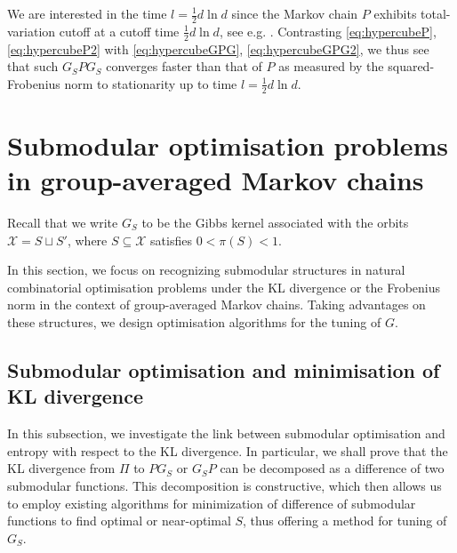 \documentclass[EJP]{ejpecp} %
\begin{document}
We are interested in the time $l = \frac{1}{2}d \ln d$ since the Markov chain $P$ exhibits total-variation cutoff at a cutoff time $\frac{1}{2}d \ln d$, see e.g. \cite[Remark $5.2.19$]{roch_mdp_2024}. Contrasting \eqref{eq:hypercubeP}, \eqref{eq:hypercubeP2} with \eqref{eq:hypercubeGPG}, \eqref{eq:hypercubeGPG2}, we thus see that such $G_S P G_S$ converges faster than that of $P$ as measured by the squared-Frobenius norm to stationarity up to time $l = \frac{1}{2} d \ln d$.

\section{Submodular optimisation problems in group-averaged Markov chains} \label{sec:opt}

Recall that we write $G_S$ to be the Gibbs kernel associated with the orbits $\mathcal{X} = S \sqcup S'$, where $S \subseteq \mathcal{X}$ satisfies $0 < \pi(S) < 1.$

In this section, we focus on recognizing submodular structures in natural combinatorial optimisation problems under the KL divergence or the Frobenius norm in the context of group-averaged Markov chains. Taking advantages on these structures, we design optimisation algorithms for the tuning of $G$.

\subsection{Submodular optimisation and minimisation of KL divergence}

In this subsection, we investigate the link between submodular optimisation and entropy with respect to the KL divergence. In particular, we shall prove that the KL divergence from $\Pi$ to $PG_S$ or $G_S P$ can be decomposed as a difference of two submodular functions. This decomposition is constructive, which then allows us to employ existing algorithms for minimization of difference of submodular functions to find optimal or near-optimal $S$, thus offering a method for tuning of $G_S$.
\end{document}
